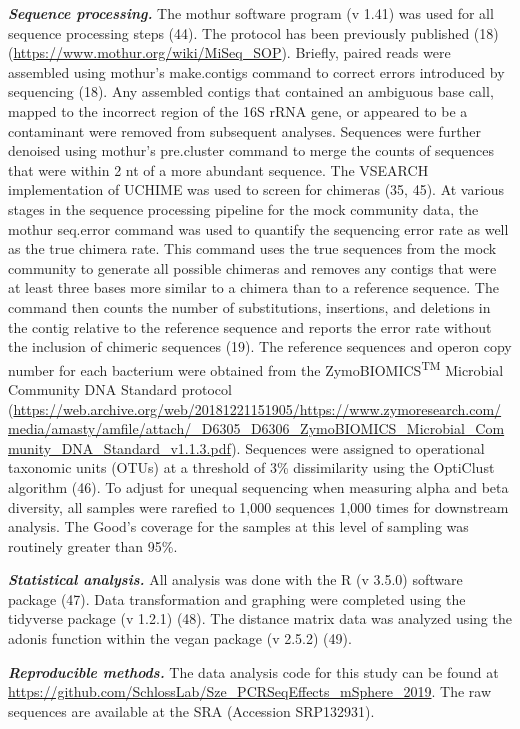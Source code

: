 \documentclass[11pt,]{article}
\begin{document}
\textbf{\emph{Sequence processing.}} The mothur software program (v
1.41) was used for all sequence processing steps (44). The protocol has
been previously published (18)
(\url{https://www.mothur.org/wiki/MiSeq_SOP}). Briefly, paired reads
were assembled using mothur's make.contigs command to correct errors
introduced by sequencing (18). Any assembled contigs that contained an
ambiguous base call, mapped to the incorrect region of the 16S rRNA
gene, or appeared to be a contaminant were removed from subsequent
analyses. Sequences were further denoised using mothur's pre.cluster
command to merge the counts of sequences that were within 2 nt of a more
abundant sequence. The VSEARCH implementation of UCHIME was used to
screen for chimeras (35, 45). At various stages in the sequence
processing pipeline for the mock community data, the mothur seq.error
command was used to quantify the sequencing error rate as well as the
true chimera rate. This command uses the true sequences from the mock
community to generate all possible chimeras and removes any contigs that
were at least three bases more similar to a chimera than to a reference
sequence. The command then counts the number of substitutions,
insertions, and deletions in the contig relative to the reference
sequence and reports the error rate without the inclusion of chimeric
sequences (19). The reference sequences and operon copy number for each
bacterium were obtained from the ZymoBIOMICS\textsuperscript{TM}
Microbial Community DNA Standard protocol
(\url{https://web.archive.org/web/20181221151905/https://www.zymoresearch.com/media/amasty/amfile/attach/_D6305_D6306_ZymoBIOMICS_Microbial_Community_DNA_Standard_v1.1.3.pdf}).
Sequences were assigned to operational taxonomic units (OTUs) at a
threshold of 3\% dissimilarity using the OptiClust algorithm (46). To
adjust for unequal sequencing when measuring alpha and beta diversity,
all samples were rarefied to 1,000 sequences 1,000 times for downstream
analysis. The Good's coverage for the samples at this level of sampling
was routinely greater than 95\%.

\textbf{\emph{Statistical analysis.}} All analysis was done with the R
(v 3.5.0) software package (47). Data transformation and graphing were
completed using the tidyverse package (v 1.2.1) (48). The distance
matrix data was analyzed using the adonis function within the vegan
package (v 2.5.2) (49).

\textbf{\emph{Reproducible methods.}} The data analysis code for this
study can be found at
\url{https://github.com/SchlossLab/Sze_PCRSeqEffects_mSphere_2019}. The
raw sequences are available at the SRA (Accession SRP132931).
\end{document}
